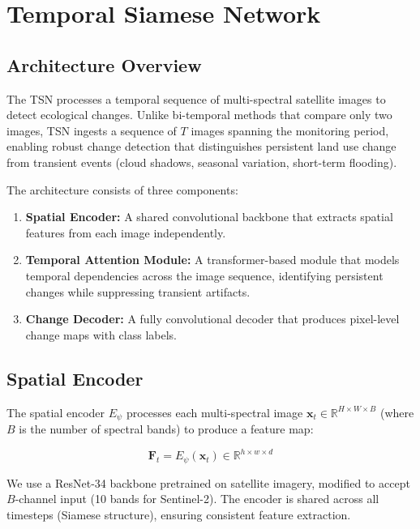 \documentclass[11pt,a4paper]{article}
\begin{document}
\section{Temporal Siamese Network}
\label{sec:tsn}

\subsection{Architecture Overview}

The TSN processes a temporal sequence of multi-spectral satellite images to detect ecological changes.
Unlike bi-temporal methods that compare only two images, TSN ingests a sequence of $T$ images spanning the monitoring period, enabling robust change detection that distinguishes persistent land use change from transient events (cloud shadows, seasonal variation, short-term flooding).

The architecture consists of three components:

\begin{enumerate}[leftmargin=*]
    \item \textbf{Spatial Encoder:} A shared convolutional backbone that extracts spatial features from each image independently.
    \item \textbf{Temporal Attention Module:} A transformer-based module that models temporal dependencies across the image sequence, identifying persistent changes while suppressing transient artifacts.
    \item \textbf{Change Decoder:} A fully convolutional decoder that produces pixel-level change maps with class labels.
\end{enumerate}

\subsection{Spatial Encoder}

The spatial encoder $E_\psi$ processes each multi-spectral image $\mathbf{x}_t \in \mathbb{R}^{H \times W \times B}$ (where $B$ is the number of spectral bands) to produce a feature map:

\begin{equation}
    \mathbf{F}_t = E_\psi(\mathbf{x}_t) \in \mathbb{R}^{h \times w \times d}
\end{equation}

We use a ResNet-34 backbone pretrained on satellite imagery, modified to accept $B$-channel input (10 bands for Sentinel-2).
The encoder is shared across all timesteps (Siamese structure), ensuring consistent feature extraction.
\end{document}

